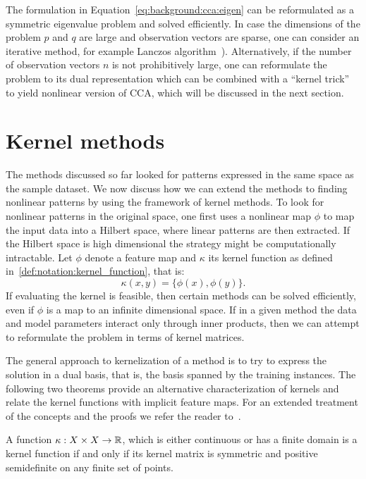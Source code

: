 The formulation in Equation~\ref{eq:background:cca:eigen} can be reformulated as a symmetric eigenvalue
problem and solved efficiently. In case the dimensions of the problem $p$ and $q$ are large and
observation vectors are sparse, one can consider an iterative method, for example Lanczos
algorithm~\cite{LAL}). Alternatively, if the number of observation vectors $n$ is not prohibitively
large, one can reformulate the problem to its dual representation which can be combined with a ``kernel trick''~\cite{FBMJ}
to yield nonlinear version of CCA, which will be discussed in the next section.

\section{Kernel methods}\label{chap:background:kernels}
The methods discussed so far looked for patterns expressed in the same space as the sample dataset. We now discuss how we can extend the methods to finding nonlinear patterns by using the framework of kernel methods.
To look for nonlinear patterns in the original space, one first uses a nonlinear map $\phi$ to map the input data into a Hilbert space, where linear patterns are then extracted. If the Hilbert space is high dimensional the strategy might be computationally intractable.
Let $\phi$ denote a feature map and $\kappa$ its kernel function as defined in~\ref{def:notation:kernel_function}, that is:
$$ \kappa(x,y) = \lbrace \phi(x), \phi(y) \rbrace.$$
If evaluating the kernel is feasible, then certain methods can be solved efficiently, even
if $\phi$ is a map to an infinite dimensional space. If in a given method the data and model parameters interact only through inner products, then
we can attempt to reformulate the problem in terms of kernel matrices.

The general approach to kernelization of a method is to try to express the solution in a dual basis, that is, the basis spanned by the training instances.
The following two theorems provide an alternative characterization of kernels and relate the kernel functions with implicit feature maps. For an extended
treatment of the concepts and the proofs we refer the reader to~\cite{shawe-taylor04kernel}.

\begin{theorem}\label{thm:background:kernel_function}
A function $\kappa: X \times X \rightarrow \mathbb{R}$, which is either continuous or has a finite domain
is a kernel function if and only if its kernel matrix is symmetric and positive semidefinite on any finite set of points.
\end{theorem}

